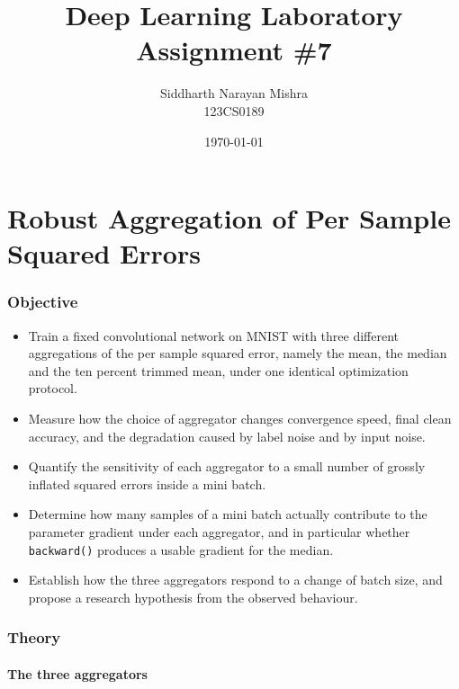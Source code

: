 \documentclass[12pt]{article}
\title{
Deep Learning Laboratory\\
Assignment \#7
}
\author{
Siddharth Narayan Mishra\\
123CS0189
}
\date{\today}
\begin{document}
\maketitle

\tableofcontents

\newpage

\part*{Robust Aggregation of Per Sample Squared Errors}

\section{Objective}

\begin{itemize}
\item Train a fixed convolutional network on MNIST with three different aggregations of the per sample squared error, namely the mean, the median and the ten percent trimmed mean, under one identical optimization protocol.
\item Measure how the choice of aggregator changes convergence speed, final clean accuracy, and the degradation caused by label noise and by input noise.
\item Quantify the sensitivity of each aggregator to a small number of grossly inflated squared errors inside a mini batch.
\item Determine how many samples of a mini batch actually contribute to the parameter gradient under each aggregator, and in particular whether \texttt{backward()} produces a usable gradient for the median.
\item Establish how the three aggregators respond to a change of batch size, and propose a research hypothesis from the observed behaviour.
\end{itemize}

\section{Theory}

\subsection{The three aggregators}
\end{document}
